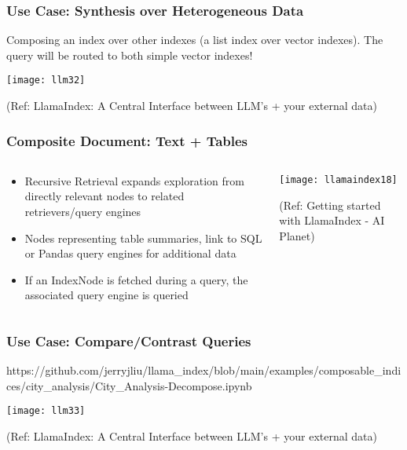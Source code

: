\begin{frame}[fragile]\frametitle{Use Case: Synthesis over Heterogeneous Data}

Composing an index over other indexes (a list index over vector indexes). 
The query will be routed to both simple vector indexes! 


\begin{center}
\texttt{[image: llm32]}

{\tiny (Ref: LlamaIndex: A Central Interface between LLM’s + your external data)}
\end{center}
\end{frame}

\begin{frame}[fragile]\frametitle{Composite Document: Text + Tables}


\begin{columns}
    \begin{column}[T]{0.4\linewidth}

		\begin{itemize}
		\item Recursive Retrieval expands exploration from directly relevant nodes to related retrievers/query engines
		\item Nodes representing table summaries, link to SQL or Pandas query engines for additional data
		\item If an IndexNode is fetched during a query, the associated query engine is queried
		\end{itemize}	
		
    \end{column}
    \begin{column}[T]{0.6\linewidth}
		\begin{center}
		\texttt{[image: llamaindex18]}

		{\tiny (Ref: Getting started with LlamaIndex - AI Planet)}
		\end{center}
    \end{column}
  \end{columns}
  


\end{frame}

\begin{frame}[fragile]\frametitle{Use Case: Compare/Contrast Queries}

https://github.com/jerryjliu/llama\_index/blob/main/examples/composable\_indices/city\_analysis/City\_Analysis-Decompose.ipynb

\begin{center}
\texttt{[image: llm33]}

{\tiny (Ref: LlamaIndex: A Central Interface between LLM’s + your external data)}
\end{center}
\end{frame}

